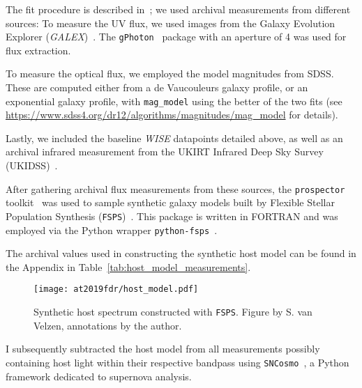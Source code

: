 The fit procedure is described in~; we used archival measurements from different sources: To measure the UV flux, we used images from the Galaxy Evolution Explorer (\textit{GALEX})~. The \texttt{gPhoton}~ package with an aperture of \SI{4}{\arcsec} was used for flux extraction.

To measure the optical flux, we employed the model magnitudes from SDSS. These are computed either from a de Vaucouleurs galaxy profile, or an exponential galaxy profile, with \texttt{mag\_model} using the better of the two fits (see \url{https://www.sdss4.org/dr12/algorithms/magnitudes/mag_model} for details).

Lastly, we included the baseline \textit{WISE} datapoints detailed above, as well as an archival infrared measurement from the UKIRT Infrared Deep Sky Survey (UKIDSS)~.

\pagebreak

After gathering archival flux measurements from these sources, the \texttt{prospector} toolkit~ was used to sample synthetic galaxy models built by Flexible Stellar Population Synthesis (\texttt{FSPS})~. This package is written in FORTRAN and was employed via the Python wrapper \texttt{python-fsps}~.

The archival values used in constructing the synthetic host model can be found in the Appendix in Table~\ref{tab:host_model_measurements}.

\begin{figure}[htb]
    \texttt{[image: at2019fdr/host\_model.pdf]}
    \caption[Synthetic host spectrum]{Synthetic host spectrum constructed with \texttt{FSPS}. Figure by S. van Velzen, annotations by the author.}
\end{figure}

I subsequently subtracted the host model from all measurements possibly containing host light within their respective bandpass using \texttt{SNCosmo}~, a Python framework dedicated to supernova analysis.

